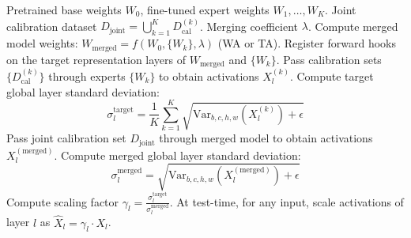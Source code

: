 \documentclass{article}
\theoremstyle{plain}
\theoremstyle{definition}
\theoremstyle{remark}
\begin{document}
\begin{algorithm}[h]
\caption{Sparsity-Preserving Task-Agnostic Calibration}
\label{alg:sptaac}
\begin{algorithmic}[1]
\REQUIRE Pretrained base weights $W_0$, fine-tuned expert weights $W_1, \dots, W_K$.
\REQUIRE Joint calibration dataset $D_{\text{joint}} = \bigcup_{k=1}^K D_{\text{cal}}^{(k)}$.
\REQUIRE Merging coefficient $\lambda$.
\STATE Compute merged model weights: $W_{\text{merged}} = f(W_0, \{W_k\}, \lambda)$ (WA or TA).
\STATE Register forward hooks on the target representation layers of $W_{\text{merged}}$ and $\{W_k\}$.
    \STATE Pass calibration sets $\{D_{\text{cal}}^{(k)}\}$ through experts $\{W_k\}$ to obtain activations $X_l^{(k)}$.
    \STATE Compute target global layer standard deviation:
    $$\sigma_l^{\text{target}} = \frac{1}{K} \sum_{k=1}^K \sqrt{\text{Var}_{b,c,h,w}(X_l^{(k)}) + \epsilon}$$
    \STATE Pass joint calibration set $D_{\text{joint}}$ through merged model to obtain activations $X_l^{(\text{merged})}$.
    \STATE Compute merged global layer standard deviation:
    $$\sigma_l^{\text{merged}} = \sqrt{\text{Var}_{b,c,h,w}(X_l^{(\text{merged})}) + \epsilon}$$
    \STATE Compute scaling factor $\gamma_l = \frac{\sigma_l^{\text{target}}}{\sigma_l^{\text{merged}}}$.
\ENDFOR
\STATE At test-time, for any input, scale activations of layer $l$ as $\hat{X}_l = \gamma_l \cdot X_l$.
\end{algorithmic}
\end{algorithm}
\end{document}
